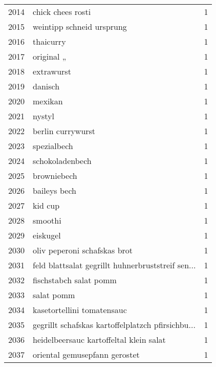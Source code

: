 \begin{tabular}{llr}
2014 &                                  chick chees rosti &      1 \\
2015 &                          weintipp schneid ursprung &      1 \\
2016 &                                          thaicurry &      1 \\
2017 &                                         original „ &      1 \\
2018 &                                         extrawurst &      1 \\
2019 &                                            danisch &      1 \\
2020 &                                            mexikan &      1 \\
2021 &                                             nystyl &      1 \\
2022 &                                  berlin currywurst &      1 \\
2023 &                                        spezialbech &      1 \\
2024 &                                    schokoladenbech &      1 \\
2025 &                                        browniebech &      1 \\
2026 &                                       baileys bech &      1 \\
2027 &                                            kid cup &      1 \\
2028 &                                            smoothi &      1 \\
2029 &                                           eiskugel &      1 \\
2030 &                       oliv peperoni schafskas brot &      1 \\
2031 &  feld blattsalat gegrillt huhnerbruststreif sen... &      1 \\
2032 &                             fischstabch salat pomm &      1 \\
2033 &                                         salat pomm &      1 \\
2034 &                         kasetortellini tomatensauc &      1 \\
2035 &  gegrillt schafskas kartoffelplatzch pfirsichbu... &      1 \\
2036 &            heidelbeersauc kartoffeltal klein salat &      1 \\
2037 &                      oriental gemusepfann gerostet &      1 \\

\end{tabular}

